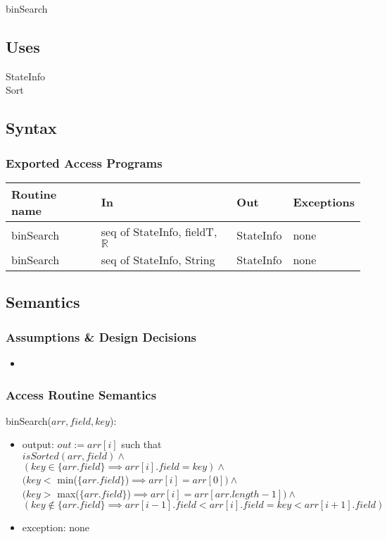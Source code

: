 \documentclass[12pt]{article}
\begin{document}
binSearch

\subsection* {Uses}

StateInfo\\
Sort

\subsection* {Syntax}

\subsubsection* {Exported Access Programs}

\begin{tabular}{| l | l | l | p{5cm} |}
\hline
\textbf{Routine name} & \textbf{In} & \textbf{Out} & \textbf{Exceptions}\\
\hline
binSearch &  seq of StateInfo, fieldT, $\mathbb{R}$ &  StateInfo & none\\
\hline
binSearch &  seq of StateInfo, String &  StateInfo & none\\
\hline
\end{tabular}

\subsection* {Semantics}

\subsubsection* {Assumptions \& Design Decisions}

\begin{itemize}
\item 
\end{itemize}

\subsubsection* {Access Routine Semantics}

binSearch($arr, field, key$):
\begin{itemize}
\item output: $\mathit{out} := arr[i]$ such that\\
\indent
$isSorted(arr, field) \land $\\ 
$(key \in \{arr.field\} \implies arr[i].field = key) \land$\\
$(key <$ min($\{arr.field\}$)$ \implies arr[i] = arr[0]) \land$\\
$(key >$ max($\{arr.field\}$)$ \implies arr[i] = arr[arr.length-1]) \land$\\
$(key \notin \{arr.field\} \implies arr[i-1].field < arr[i].field = key < arr[i+1].field)$
\item exception: none
\end{itemize}
\end{document}
